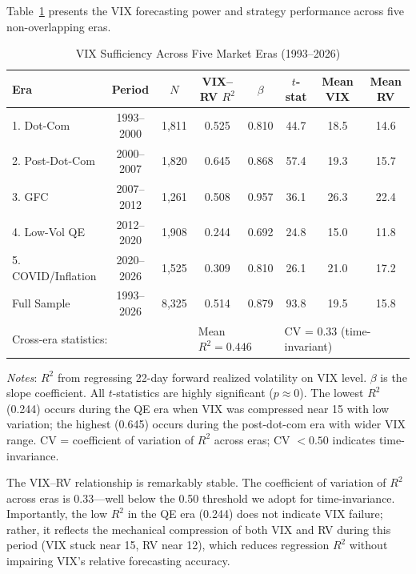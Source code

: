 \documentclass[12pt,a4paper]{article}
\begin{document}
Table~\ref{tab:era_stability} presents the VIX forecasting power and strategy performance across five non-overlapping eras.

\begin{table}[H]
\centering
\small
\begin{threeparttable}
\caption{VIX Sufficiency Across Five Market Eras (1993--2026)}
\label{tab:era_stability}
\begin{tabular}{@{}lccccccc@{}}
\toprule
Era & Period & $N$ & VIX--RV $R^2$ & $\beta$ & $t$-stat & Mean VIX & Mean RV \\
\midrule
1. Dot-Com & 1993--2000 & 1,811 & 0.525 & 0.810 & 44.7 & 18.5 & 14.6 \\
2. Post-Dot-Com & 2000--2007 & 1,820 & 0.645 & 0.868 & 57.4 & 19.3 & 15.7 \\
3. GFC & 2007--2012 & 1,261 & 0.508 & 0.957 & 36.1 & 26.3 & 22.4 \\
4. Low-Vol QE & 2012--2020 & 1,908 & 0.244 & 0.692 & 24.8 & 15.0 & 11.8 \\
5. COVID/Inflation & 2020--2026 & 1,525 & 0.309 & 0.810 & 26.1 & 21.0 & 17.2 \\
\midrule
Full Sample & 1993--2026 & 8,325 & 0.514 & 0.879 & 93.8 & 19.5 & 15.8 \\
\midrule
\multicolumn{3}{l}{Cross-era statistics:} & \multicolumn{2}{l}{Mean $R^2 = 0.446$} & \multicolumn{3}{l}{CV = 0.33 (time-invariant)} \\
\bottomrule
\end{tabular}
\begin{tablenotes}
\small
\item \textit{Notes}: $R^2$ from regressing 22-day forward realized volatility on VIX level. $\beta$ is the slope coefficient. All $t$-statistics are highly significant ($p \approx 0$). The lowest $R^2$ (0.244) occurs during the QE era when VIX was compressed near 15 with low variation; the highest (0.645) occurs during the post-dot-com era with wider VIX range. CV = coefficient of variation of $R^2$ across eras; CV $< 0.50$ indicates time-invariance.
\end{tablenotes}
\end{threeparttable}
\end{table}

The VIX--RV relationship is remarkably stable. The coefficient of variation of $R^2$ across eras is 0.33---well below the 0.50 threshold we adopt for time-invariance. Importantly, the low $R^2$ in the QE era (0.244) does not indicate VIX failure; rather, it reflects the mechanical compression of both VIX and RV during this period (VIX stuck near 15, RV near 12), which reduces regression $R^2$ without impairing VIX's relative forecasting accuracy.
\end{document}
